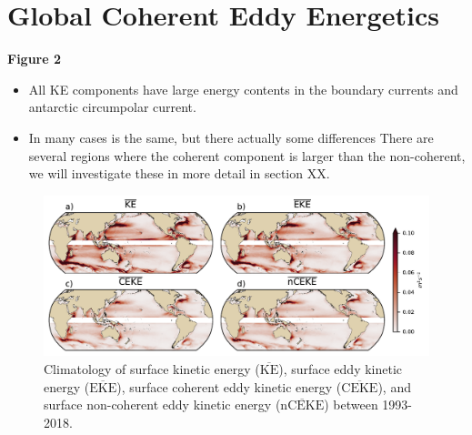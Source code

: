 \documentclass[draft,linenumbers]{agujournal2019}
\newcommand{\MKE}{\overline{\textrm{KE}}}
\newcommand{\MEKE}{\overline{\textrm{EKE}}}
\newcommand{\MCEKE}{\overline{\textrm{CEKE}}}
\newcommand{\MnCEKE}{\overline{\textrm{nCEKE}}}
\begin{document}

	\section{Global Coherent Eddy Energetics}
	\label{subsec:CEKE_climatology}

	\textbf{Figure 2}
	\begin{itemize}
		\item All KE components have large energy contents in the boundary currents and antarctic circumpolar current. 
		\item In many cases is the same, but there actually some differences There are several regions where the coherent component is larger than the non-coherent, we will investigate these in more detail in section XX.
	\end{itemize}

	\begin{figure}
	    \centering
	    \includegraphics[width=1\textwidth]{figures/mean_ke_maps_satellite.pdf}
	    \caption{Climatology of surface kinetic energy ($\MKE$), surface eddy kinetic energy ($\MEKE$), surface coherent eddy kinetic energy ($\MCEKE$), and surface non-coherent eddy kinetic energy ($\MnCEKE$) between 1993-2018.}
	    \label{fig:eddy_climatology}
	\end{figure}

\end{document}
